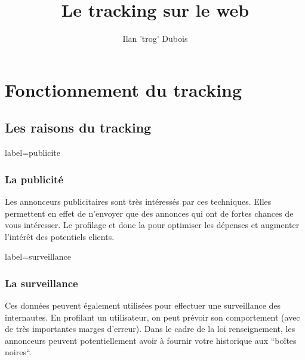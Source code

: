 \documentclass{beamer}
\title{Le tracking sur le web}
\author{Ilan 'trog' Dubois}
\begin{document}
    \begin{frame}
        \titlepage
    \end{frame}
    \section{Fonctionnement du tracking}
    \subsection{Les raisons du tracking}
        \begin{frame}{label=publicite}
            \frametitle{La publicité}
            \begin{center}
                Les annonceurs publicitaires sont très intéressés par ces techniques.
                Elles permettent en effet de n'envoyer que des annonces qui ont de fortes chances de vous intéresser.
                Le profilage et donc la pour optimiser les dépenses et augmenter l'intérêt des potentiels clients.
            \end{center}
        \end{frame}
        \begin{frame}{label=surveillance}
            \frametitle{La surveillance}
            \begin{center}
                Ces données peuvent également utilisées pour effectuer une surveillance des internautes.
                En profilant un utilisateur, on peut prévoir son comportement (avec de très importantes marges d'erreur).
                Dans le cadre de la loi renseignement, les annonceurs peuvent potentiellement avoir à fournir votre historique aux ``boîtes noires``.
            \end{center}
        \end{frame}
\end{document}
